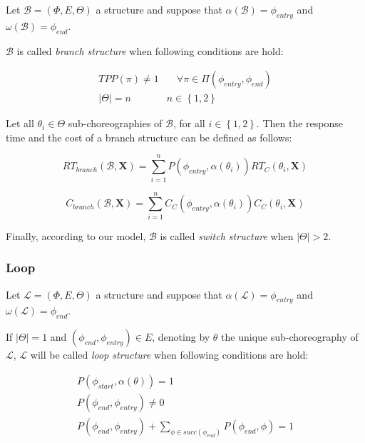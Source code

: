 Let $\mathcal{B} = (\Phi,E,\Theta)$ a structure and suppose that $\alpha(\mathcal{B}) = \phi_{entry}$ and $\omega(\mathcal{B}) = \phi_{end}$. 

$\mathcal{B}$ is called \textit{branch structure} when following conditions are hold:

\begin{eqnarray}
	TPP(\pi) \neq 1  & \quad \forall \pi \in \Pi(\phi_{entry}, \phi_{end}) \\
    |\Theta| = n  & n \in \left\lbrace 1,2 \right\rbrace 
\end{eqnarray}

Let all $\theta_i \in \Theta$ sub-choreographies of $\mathcal{B}$, for all $i \in \left\lbrace 1,2 \right\rbrace $. Then the response time and the cost of a branch structure can be defined as follows:

\begin{equation}
	RT_{branch}(\mathcal{B}, \textbf{X}) = \sum_{i = 1}^n P(\phi_{entry}, \alpha(\theta_i)) RT_C(\theta_i, \textbf{X})
\end{equation}

\begin{equation}
	C_{branch}(\mathcal{B}, \textbf{X}) = \sum_{i = 1}^n C_C(\phi_{entry}, \alpha(\theta_i)) C_C(\theta_i, \textbf{X})
\end{equation}

Finally, according to our model, $\mathcal{B}$ is called \textit{switch structure} when $|\Theta| > 2$.

\subsubsection{Loop}

Let $\mathcal{L} = (\Phi,E,\Theta)$ a structure and suppose that $\alpha(\mathcal{L}) = \phi_{entry}$ and $\omega(\mathcal{L}) = \phi_{end}$. 

If $|\Theta| = 1$ and $(\phi_{end}, \phi_{entry}) \in E$, denoting by $\theta$ the unique sub-choreography of $\mathcal{L}$, $\mathcal{L}$ will be called \textit{loop structure} when following conditions are hold:

\begin{eqnarray}
	P(\phi_{start}, \alpha(\theta)) = 1 \\
	P(\phi_{end}, \phi_{entry}) \neq 0 \\
	P(\phi_{end}, \phi_{entry}) + \sum_{\phi \in succ(\phi_{end})} P(\phi_{end}, \phi) = 1
\end{eqnarray}

